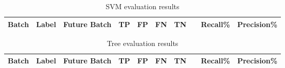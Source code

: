 \begin{table}[t]
\centering
\singlespacing
\small
\begin{tabular}{| c | c | c | c |c | c | c | c | c | c |}
\hline
	Batch &	Label & Future Batch & TP & FP & FN & TN & & Recall\% & Precision\% \\
\hline

\hline
\end{tabular}
\caption{SVM evaluation results}
\label{tab:svmevalresults}
\end{table}
\newpage
\begin{table}[t]
\centering
\singlespacing
\small
\begin{tabular}{| c | c | c | c |c | c | c | c | c | c |}
\hline
	Batch &	Label & Future Batch & TP & FP & FN & TN & & Recall\% & Precision\% \\
\hline

\hline
\end{tabular}
\caption{Tree evaluation results}
\label{tab:treeevalresults}
\end{table}